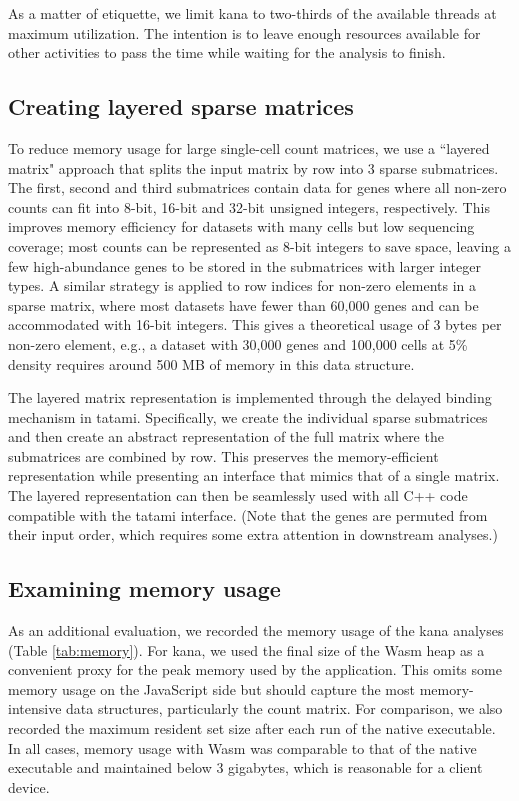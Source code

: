 \documentclass{article}
\begin{document}
As a matter of etiquette, we limit kana to two-thirds of the available threads at maximum utilization.
The intention is to leave enough resources available for other activities to pass the time while waiting for the analysis to finish.

\subsection{Creating layered sparse matrices}

To reduce memory usage for large single-cell count matrices, we use a ``layered matrix" approach that splits the input matrix by row into 3 sparse submatrices.
The first, second and third submatrices contain data for genes where all non-zero counts can fit into 8-bit, 16-bit and 32-bit unsigned integers, respectively.
This improves memory efficiency for datasets with many cells but low sequencing coverage;
most counts can be represented as 8-bit integers to save space, leaving a few high-abundance genes to be stored in the submatrices with larger integer types.
A similar strategy is applied to row indices for non-zero elements in a sparse matrix, where most datasets have fewer than 60,000 genes and can be accommodated with 16-bit integers.
This gives a theoretical usage of 3 bytes per non-zero element, e.g., a dataset with 30,000 genes and 100,000 cells at 5\% density requires around 500 MB of memory in this data structure.

The layered matrix representation is implemented through the delayed binding mechanism in tatami.
Specifically, we create the individual sparse submatrices and then create an abstract representation of the full matrix where the submatrices are combined by row.
This preserves the memory-efficient representation while presenting an interface that mimics that of a single matrix.
The layered representation can then be seamlessly used with all C++ code compatible with the tatami interface.
(Note that the genes are permuted from their input order, which requires some extra attention in downstream analyses.)

\subsection{Examining memory usage}

As an additional evaluation, we recorded the memory usage of the kana analyses (Table \ref{tab:memory}).
For kana, we used the final size of the Wasm heap as a convenient proxy for the peak memory used by the application.
This omits some memory usage on the JavaScript side but should capture the most memory-intensive data structures, particularly the count matrix.
For comparison, we also recorded the maximum resident set size after each run of the native executable.
In all cases, memory usage with Wasm was comparable to that of the native executable and maintained below 3 gigabytes,
which is reasonable for a client device.
\end{document}
